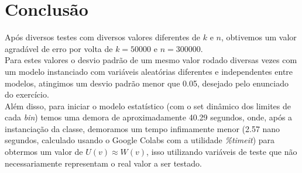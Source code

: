 \documentclass[twocolumn,amsmath,amssymb,floatfix]{revtex4}
\begin{document}
\section{Conclusão}
\indent Após diversos testes com diversos valores diferentes de $k$ e $n$, obtivemos um valor agradável de erro por volta de $k = 50000$ e $n = 300000$. \\
\indent Para estes valores o desvio padrão de um mesmo valor rodado diversas vezes com um modelo instanciado com variáveis aleatórias diferentes e independentes entre modelos, atingimos um desvio padrão menor que 0.05, desejado pelo enunciado do exercício. \\
\indent Além disso, para iniciar o modelo estatístico (com o set dinâmico dos limites de cada \textit{bin}) temos uma demora de aproximadamente 40.29 segundos, onde, após a instanciação da classe, demoramos um tempo infimamente menor (2.57 nano segundos, calculado usando o Google Colabs com a utilidade \textit{\%timeit}) para obtermos um valor de $U(v) \approx W(v)$, isso utilizando variáveis de teste que não necessariamente representam o real valor a ser testado.
\end{document}
